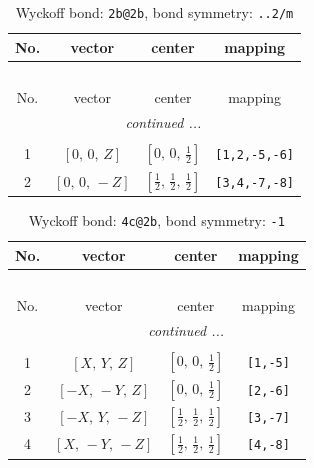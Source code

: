 \documentclass[fleqn,8pt]{jsarticle}
\begin{document}
\renewcommand{\arraystretch}{1.2}
\begin{longtable}{cccc}
\caption{Wyckoff bond: {\tt 2b@2b}, bond symmetry: {\tt ..2/m}}
 \\
 \hline \hline
No. & vector & center & mapping \\ \hline \endfirsthead

\multicolumn{3}{l}{\tablename\ \thetable{}} \\
 \hline \hline
No. & vector & center & mapping \\ \hline \endhead

 \hline \hline
\multicolumn{3}{r}{\footnotesize\it continued ...} \\ \endfoot

 \hline \hline
\multicolumn{3}{r}{} \\ \endlastfoot

1 & $\left[ 0,\, 0,\, Z \right]$ & $\left[ 0,\, 0,\, \frac{1}{2} \right]$ & {\tt [1,2,-5,-6]} \\ \hline
2 & $\left[ 0,\, 0,\, - Z \right]$ & $\left[ \frac{1}{2},\, \frac{1}{2},\, \frac{1}{2} \right]$ & {\tt [3,4,-7,-8]} \\
\end{longtable}
\renewcommand{\arraystretch}{1.2}
\begin{longtable}{cccc}
\caption{Wyckoff bond: {\tt 4c@2b}, bond symmetry: {\tt -1}}
 \\
 \hline \hline
No. & vector & center & mapping \\ \hline \endfirsthead

\multicolumn{3}{l}{\tablename\ \thetable{}} \\
 \hline \hline
No. & vector & center & mapping \\ \hline \endhead

 \hline \hline
\multicolumn{3}{r}{\footnotesize\it continued ...} \\ \endfoot

 \hline \hline
\multicolumn{3}{r}{} \\ \endlastfoot

1 & $\left[ X,\, Y,\, Z \right]$ & $\left[ 0,\, 0,\, \frac{1}{2} \right]$ & {\tt [1,-5]} \\ \hline
2 & $\left[ - X,\, - Y,\, Z \right]$ & $\left[ 0,\, 0,\, \frac{1}{2} \right]$ & {\tt [2,-6]} \\ \hline
3 & $\left[ - X,\, Y,\, - Z \right]$ & $\left[ \frac{1}{2},\, \frac{1}{2},\, \frac{1}{2} \right]$ & {\tt [3,-7]} \\ \hline
4 & $\left[ X,\, - Y,\, - Z \right]$ & $\left[ \frac{1}{2},\, \frac{1}{2},\, \frac{1}{2} \right]$ & {\tt [4,-8]} \\
\end{longtable}
\end{document}
